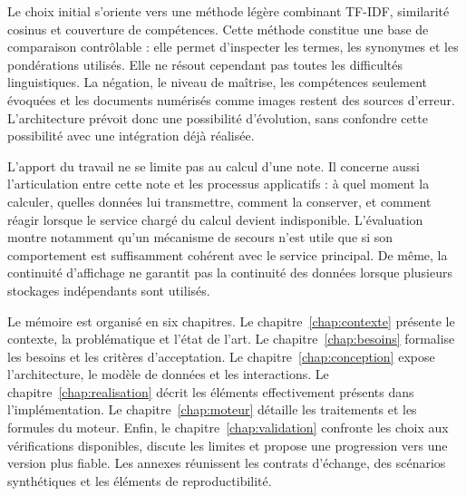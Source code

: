 Le choix initial s'oriente vers une méthode légère combinant TF-IDF, similarité cosinus et couverture de compétences. Cette méthode constitue une base de comparaison contrôlable : elle permet d'inspecter les termes, les synonymes et les pondérations utilisés. Elle ne résout cependant pas toutes les difficultés linguistiques. La négation, le niveau de maîtrise, les compétences seulement évoquées et les documents numérisés comme images restent des sources d'erreur. L'architecture prévoit donc une possibilité d'évolution, sans confondre cette possibilité avec une intégration déjà réalisée.

L'apport du travail ne se limite pas au calcul d'une note. Il concerne aussi l'articulation entre cette note et les processus applicatifs : à quel moment la calculer, quelles données lui transmettre, comment la conserver, et comment réagir lorsque le service chargé du calcul devient indisponible. L'évaluation montre notamment qu'un mécanisme de secours n'est utile que si son comportement est suffisamment cohérent avec le service principal. De même, la continuité d'affichage ne garantit pas la continuité des données lorsque plusieurs stockages indépendants sont utilisés.

Le mémoire est organisé en six chapitres. Le chapitre~\ref{chap:contexte} présente le contexte, la problématique et l'état de l'art. Le chapitre~\ref{chap:besoins} formalise les besoins et les critères d'acceptation. Le chapitre~\ref{chap:conception} expose l'architecture, le modèle de données et les interactions. Le chapitre~\ref{chap:realisation} décrit les éléments effectivement présents dans l'implémentation. Le chapitre~\ref{chap:moteur} détaille les traitements et les formules du moteur. Enfin, le chapitre~\ref{chap:validation} confronte les choix aux vérifications disponibles, discute les limites et propose une progression vers une version plus fiable. Les annexes réunissent les contrats d'échange, des scénarios synthétiques et les éléments de reproductibilité.
